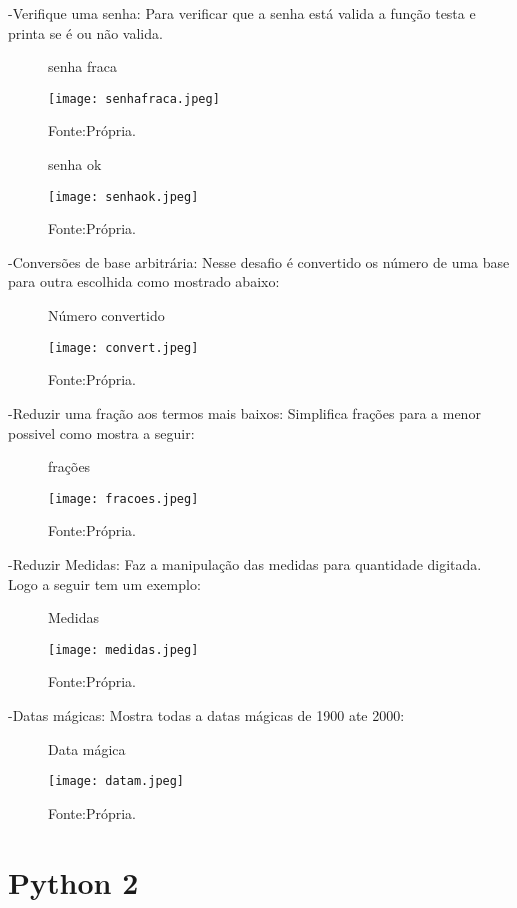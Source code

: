 -Verifique uma senha:
Para verificar que a senha está valida a função testa e printa se é ou não valida.
\begin{figure} [h!]	
    \centering
    \caption{senha fraca}
    \texttt{[image: senhafraca.jpeg]}
    \caption*{Fonte:Própria.}
    \label{fig:senhafraca}
\end{figure}
\begin{figure} [h!]	
    \centering
    \caption{senha ok}
    \texttt{[image: senhaok.jpeg]}
    \caption*{Fonte:Própria.}
    \label{fig:senhaok}
\end{figure}

-Conversões de base arbitrária:
Nesse desafio é convertido os número de uma base para outra escolhida como mostrado abaixo:

\begin{figure} [h!]	
    \centering
    \caption{Número convertido}
    \texttt{[image: convert.jpeg]}
    \caption*{Fonte:Própria.}
    \label{fig:convert}
\end{figure}

-Reduzir uma fração aos termos mais baixos:
Simplifica frações para a menor possivel como mostra a seguir:
\begin{figure} [h!]	
    \centering
    \caption{frações}
    \texttt{[image: fracoes.jpeg]}
    \caption*{Fonte:Própria.}
    \label{fig:fracao}
\end{figure}

-Reduzir Medidas:
Faz a manipulação das medidas para quantidade digitada.
Logo a seguir tem um exemplo:

\begin{figure} [h!]	
    \centering
    \caption{Medidas}
    \texttt{[image: medidas.jpeg]}
    \caption*{Fonte:Própria.}
    \label{fig:medidas}
\end{figure}

-Datas mágicas:
Mostra todas a datas mágicas de 1900 ate 2000:

\begin{figure} [h!]	
    \centering
    \caption{Data mágica}
    \texttt{[image: datam.jpeg]}
    \caption*{Fonte:Própria.}
    \label{fig:datamagica}
\end{figure}

\section{Python 2}

